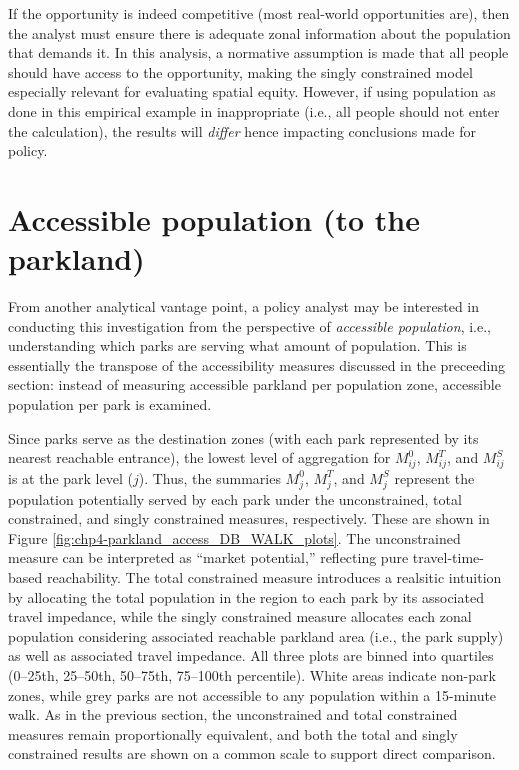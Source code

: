 \documentclass[
11pt, %
oneside, %
english, %
singlespacing, %
]{macthesis} %
\begin{document}
If the opportunity is indeed competitive (most real-world opportunities are), then the analyst must ensure there is adequate zonal information about the population that demands it. In this analysis, a normative assumption is made that all people should have access to the opportunity, making the singly constrained model especially relevant for evaluating spatial equity. However, if using population as done in this empirical example in inappropriate (i.e., all people should not enter the calculation), the results will \emph{differ} hence impacting conclusions made for policy.

\section{Accessible population (to the parkland)}\label{accessible-population-to-the-parkland}

From another analytical vantage point, a policy analyst may be interested in conducting this investigation from the perspective of \emph{accessible population}, i.e., understanding which parks are serving what amount of population. This is essentially the transpose of the accessibility measures discussed in the preceeding section: instead of measuring accessible parkland per population zone, accessible population per park is examined.

Since parks serve as the destination zones (with each park represented by its nearest reachable entrance), the lowest level of aggregation for \(M^0_{ij}\), \(M^T_{ij}\), and \(M^S_{ij}\) is at the park level (\(j\)). Thus, the summaries \(M^0_j\), \(M^T_j\), and \(M^S_j\) represent the population potentially served by each park under the unconstrained, total constrained, and singly constrained measures, respectively. These are shown in Figure \ref{fig:chp4-parkland_access_DB_WALK_plots}. The unconstrained measure can be interpreted as ``market potential,'' reflecting pure travel-time-based reachability. The total constrained measure introduces a realsitic intuition by allocating the total population in the region to each park by its associated travel impedance, while the singly constrained measure allocates each zonal population considering associated reachable parkland area (i.e., the park supply) as well as associated travel impedance. All three plots are binned into quartiles (0--25th, 25--50th, 50--75th, 75--100th percentile). White areas indicate non-park zones, while grey parks are not accessible to any population within a 15-minute walk. As in the previous section, the unconstrained and total constrained measures remain proportionally equivalent, and both the total and singly constrained results are shown on a common scale to support direct comparison.
\end{document}
